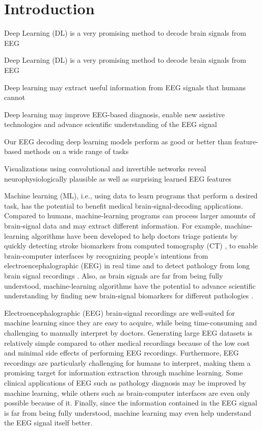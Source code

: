 \chapter{Introduction}\label{introduction}

\begin{startbox}{Deep Learning (DL) is a very promising method to decode brain signals from EEG}
 \item Deep Learning (DL) is a very promising method to decode brain signals from EEG
\item Deep learning may extract useful information from EEG signals that humans cannot
\item Deep learning may improve EEG-based diagnosis, enable new assistive technologies and advance scientific understanding of the EEG signal
\item Our EEG decoding deep learning models perform as good or better than feature-based methods on a wide range of tasks
\item Visualizations using convolutional and invertible networks reveal neurophysiologically plausible as well as surprising learned EEG features
\end{startbox}


Machine learning (ML), i.e., using data to learn programs that perform a
desired task, has the potential to benefit medical brain-signal-decoding
applications. Compared to humans, machine-learning programs can process
larger amounts of brain-signal data and may extract different
information. For example, machine-learning algorithms have been
developed to help doctors triage patients by quickly detecting stroke
biomarkers from computed tomography (CT)
\citep{chavva2022deep}, to enable brain-computer interfaces
by recognizing people's intentions from electroencephalographic (EEG) in
real time \citep{abiri2019comprehensive} and to detect
pathology from long brain signal recordings
\citep{gemein2020machine,schirrmeisterdeeppathology}. Also,
as brain signals are far from being fully understood, machine-learning
algorithms have the potential to advance scientific understanding by
finding new brain-signal biomarkers for different pathologies
\citep{raghu2020survey}.



    Electroencephalographic (EEG) brain-signal recordings are well-suited
for machine learning since they are easy to acquire, while being
time-consuming and challenging to manually interpret by doctors.
Generating large EEG datasets is relatively simple compared to other
medical recordings because of the low cost and minimal side effects of
performing EEG recordings. Furthermore, EEG recordings are particularly
challenging for humans to interpret, making them a promising target for
information extraction through machine learning. Some clinical
applications of EEG such as pathology diagnosis may be improved by
machine learning, while others such as brain-computer interfaces are
even only possible because of it. Finally, since the information
contained in the EEG signal is far from being fully understood, machine
learning may even help understand the EEG signal itself better.


